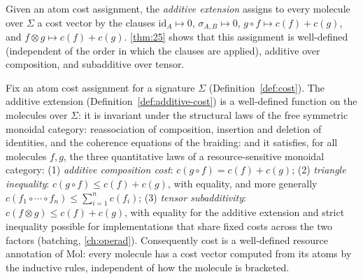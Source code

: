 \begin{definition}\label{def:additive-cost}
Given an atom cost assignment, the \emph{additive extension} assigns to every
molecule over $\Sigma$ a cost vector by the clauses
$\mathrm{id}_A \mapsto 0$, $\sigma_{A,B} \mapsto 0$,
$g \circ f \mapsto c (f) + c (g)$, and $f \otimes g \mapsto c (f) + c (g)$.
\autoref{thm:25} shows that this assignment is well-defined (independent of the order in
which the clauses are applied), additive over composition, and subadditive
over tensor.
\end{definition}

\begin{theorem}\label{thm:25}
 Fix an atom cost assignment for a signature $\Sigma$
(Definition~\ref{def:cost}). The additive extension
(Definition~\ref{def:additive-cost}) is a well-defined function on the
molecules over $\Sigma$: it is invariant under the structural laws of the free
symmetric monoidal category: reassociation of composition, insertion and
deletion of identities, and the coherence equations of the braiding: and it
satisfies, for all molecules $f, g$, the three quantitative laws of a
resource-sensitive monoidal category:
(1) \emph{additive composition cost}: $c (g \circ f) = c (f) + c (g)$;
(2) \emph{triangle inequality}: $c (g \circ f) \le c (f) + c (g)$, with equality,
and more generally $c (f_1 \circ \cdots \circ f_n) \le \sum_{i=1}^{n} c (f_i)$;
(3) \emph{tensor subadditivity}: $c (f \otimes g) \le c (f) + c (g)$, with
equality for the additive extension and strict inequality possible for
implementations that share fixed costs across the two factors (batching,
\autoref{ch:operad}).
Consequently cost is a well-defined resource annotation of Mol: every molecule
has a cost vector computed from its atoms by the inductive rules, independent
of how the molecule is bracketed.
\end{theorem}

